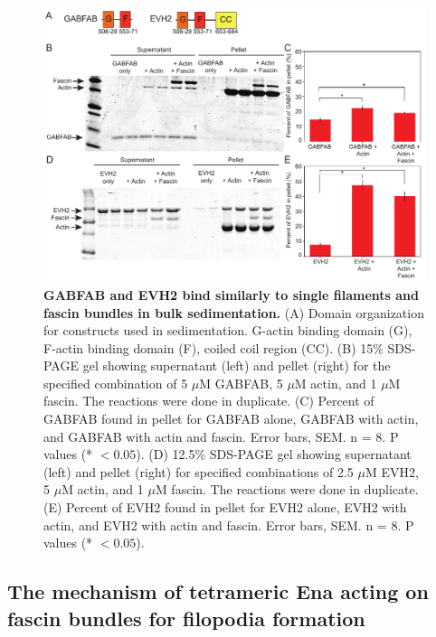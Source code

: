 \begin{figure}
\centering
\includegraphics[width=\textwidth]{img/ch02/sedimentation_thesis.pdf}
\caption[GABFAB and EVH2 bind similarly to single filaments and fascin bundles in bulk sedimentation.]{\textbf{GABFAB and EVH2 bind similarly to single filaments and fascin bundles in bulk sedimentation.} (A) Domain organization for constructs used in sedimentation. G-actin binding domain (G), F-actin binding domain (F), coiled coil region (CC). (B) 15\% SDS-PAGE gel showing supernatant (left) and pellet (right) for the specified combination of 5 $\mu$M GABFAB, 5 $\mu$M actin, and 1 $\mu$M fascin. The reactions were done in duplicate. (C) Percent of GABFAB found in pellet for GABFAB alone, GABFAB with actin, and GABFAB with actin and fascin. Error bars, SEM. n = 8. P values (* $<0.05$). (D) 12.5\% SDS-PAGE gel showing supernatant (left) and pellet (right) for specified combinations of 2.5 $\mu$M EVH2, 5 $\mu$M actin, and 1 $\mu$M fascin. The reactions were done in duplicate. (E) Percent of EVH2 found in pellet for EVH2 alone, EVH2 with actin, and EVH2 with actin and fascin. Error bars, SEM. n = 8. P values (* $<0.05$).}
\label{fig:sedimentation}
\end{figure}

\subsection{The mechanism of tetrameric Ena acting on fascin bundles for filopodia formation}\label{filopodia-mechanism}

